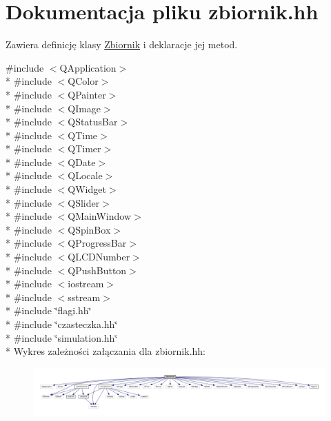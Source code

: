 \hypertarget{zbiornik_8hh}{\section{Dokumentacja pliku zbiornik.\-hh}
\label{zbiornik_8hh}
}


Zawiera definicję klasy \hyperlink{class_zbiornik}{Zbiornik} i deklaracje jej metod.  


{\ttfamily \#include $<$Q\-Application$>$}\\*
{\ttfamily \#include $<$Q\-Color$>$}\\*
{\ttfamily \#include $<$Q\-Painter$>$}\\*
{\ttfamily \#include $<$Q\-Image$>$}\\*
{\ttfamily \#include $<$Q\-Status\-Bar$>$}\\*
{\ttfamily \#include $<$Q\-Time$>$}\\*
{\ttfamily \#include $<$Q\-Timer$>$}\\*
{\ttfamily \#include $<$Q\-Date$>$}\\*
{\ttfamily \#include $<$Q\-Locale$>$}\\*
{\ttfamily \#include $<$Q\-Widget$>$}\\*
{\ttfamily \#include $<$Q\-Slider$>$}\\*
{\ttfamily \#include $<$Q\-Main\-Window$>$}\\*
{\ttfamily \#include $<$Q\-Spin\-Box$>$}\\*
{\ttfamily \#include $<$Q\-Progress\-Bar$>$}\\*
{\ttfamily \#include $<$Q\-L\-C\-D\-Number$>$}\\*
{\ttfamily \#include $<$Q\-Push\-Button$>$}\\*
{\ttfamily \#include $<$iostream$>$}\\*
{\ttfamily \#include $<$sstream$>$}\\*
{\ttfamily \#include \char`\"{}flagi.\-hh\char`\"{}}\\*
{\ttfamily \#include \char`\"{}czasteczka.\-hh\char`\"{}}\\*
{\ttfamily \#include \char`\"{}simulation.\-hh\char`\"{}}\\*
Wykres zależności załączania dla zbiornik.\-hh\-:\nopagebreak
\begin{figure}[H]
\begin{center}
\leavevmode
\includegraphics[width=350pt]{zbiornik_8hh__incl}
\end{center}
\end{figure}
